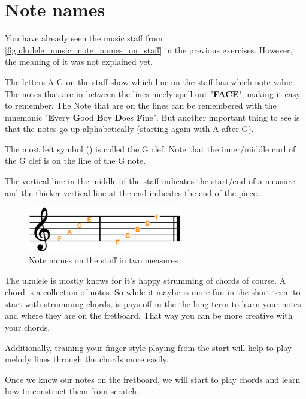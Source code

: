 \section{Note names}

You have already seen the music staff from \autoref{fig:ukulele_music_note_names_on_staff} in the previous exercises. However, the meaning of it was not explained yet.

The letters A-G on the staff show which line on the staff has which note value. The notes that are in between the lines nicely spell out "\textbf{FACE}", making it easy to remember. The Note that are on the lines can be remembered with the mnemonic "\textbf{E}very \textbf{G}ood \textbf{B}oy \textbf{D}oes \textbf{F}ine". But another important thing to see is that the notes go up alphabetically (starting again with A after G). 

The most left symbol (\clefG) is called the G clef. Note that the inner/middle curl of the G clef is on the line of the G note. 

The vertical line in the middle of the staff indicates the start/end of a measure. and the thicker vertical line at the end indicates the end of the piece.

\begin{figure}[h]
	\centering
	\includegraphics[width=0.6\textwidth]{../../Images/MusicNotation_MeasureNoteNames.png}
	\caption{Note names on the staff in two measures}
	\label{fig:ukulele_music_note_names_on_staff}
\end{figure}

The ukulele is mostly knows for it's happy strumming of chords of course. A chord is a collection of notes. So while it maybe is more fun in the short term to start with strumming chords, is pays off in the the long term to learn your notes and where they are on the fretboard. That way you can be more creative with your chords.

Additionally, training your finger-style playing from the start will help to play melody lines through the chords more easily.

Once we know our notes on the fretboard, we will start to play chords and learn how to construct them from scratch.

\newpage

